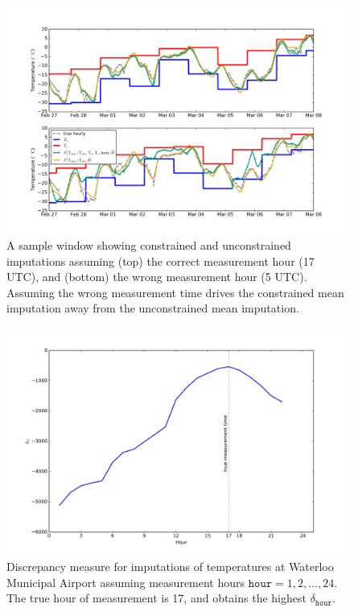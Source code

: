 \documentclass[letter]{article}
\makeatletter
\def\maxwidth{\ifdim\Gin@nat@width>\linewidth\linewidth
\else\Gin@nat@width\fi}
\let\Oldincludegraphics\includegraphics
\renewcommand{\includegraphics}[1]{\Oldincludegraphics[width=.8\maxwidth]{#1}}
\newcommand{\hour}{\mathtt{hour}}
\makeatother
\begin{document}
        \begin{figure}
\centering
\includegraphics{figures/measure_hour_example.png}
\caption{\label{fig:measure_hour_example} A sample window showing constrained and unconstrained imputations assuming (top) the correct measurement hour (17 UTC), and (bottom) the wrong measurement hour (5 UTC). Assuming the wrong measurement time drives the constrained mean imputation away from the unconstrained mean imputation.}
\end{figure}
    


        \begin{figure}
\centering
\includegraphics{figures/hr_inference.png}
\caption{\label{fig:hr_inference} Discrepancy measure for imputations of temperatures at Waterloo Municipal Airport assuming measurement hours \(\hour=1,2,\ldots,24\). The true hour of measurement is 17, and obtains the highest \(\delta_\hour\).}
\end{figure}
    
\end{document}
